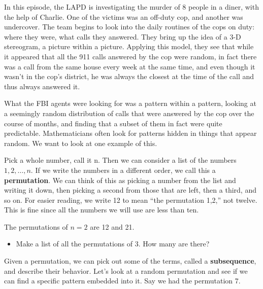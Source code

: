 \newpage
{}
{}
\setcounter{activity}{0}

In this episode, the LAPD is investigating the murder of 8 people in a diner, with the help of Charlie. One of the victims was an off-duty cop, and another was undercover. The team begins to look into the daily routines of the cops on duty: where they were, what calls they answered. They bring up the idea of a 3-D stereogram, a picture within a picture. Applying this model, they see that while it appeared that all the 911 calls answered by the cop were random, in fact there was a call from the same house every week at the same time, and even though it wasn’t in the cop’s district, he was always the closest at the time of the call and thus always answered it.


What the FBI agents were looking for was a pattern within a pattern, looking at a seemingly random distribution of calls that were answered by the cop over the course of months, and finding that a subset of them in fact were quite predictable. Mathematicians often look for patterns hidden in things that appear random. We want to look at one example of this.


Pick a whole number, call it n. Then we can consider a list of the numbers $1, 2,\ldots, n$. If we write the numbers in a different order, we call this a \textbf{permutation}. We can think of this as picking a number from the list and writing it down, then picking a second from those that are left, then a third, and so on. For easier reading, we write 12 to mean ``the permutation 1,2,'' not twelve. This is fine since all the numbers we will use are less than ten.


\begin{ex}
The permutations of $n=2$ are 12 and 21. 
\end{ex}


\begin{itemize}
\item Make a list of all the permutations of 3. How many are there?
\end{itemize}


Given a permutation, we can pick out some of the terms, called a \textbf{subsequence}, and describe their behavior. Let’s look at a random permutation and see if we can find a specific pattern embedded into it. Say we had the permutation 7\;\;\;\;\;\;\;.



